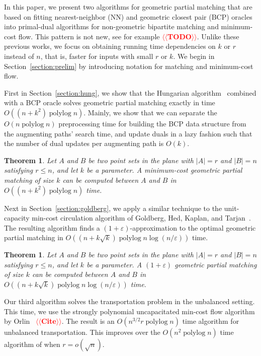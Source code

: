 \documentclass[11pt]{article}
\makeatletter
\def\polylog{\mathop{\mathrm{polylog}}}
\def\eps{\varepsilon}
\theoremstyle{plain}
\newtheorem{theorem}[lemma]{Theorem}
\numberwithin{figure}{section}
\def\n@te#1{\textsf{\boldmath \textbf{$\langle\!\langle$#1$\rangle\!\rangle$}}\leavevmode}
\def\note#1{\textcolor{red}{\n@te{#1}}}
\makeatother
\begin{document}
In this paper, we present two algorithms for geometric partial matching
that are based on fitting nearest-neighbor (NN) and geometric closest pair
(BCP) oracles into primal-dual algorithms for non-geometric bipartite matching
and minimum-cost flow.
This pattern is not new, see for example \note{TODO}.
Unlike these previous works, we focus on obtaining running time dependencies on
$k$ or $r$ instead of $n$, that is, faster for inputs with small $r$ or $k$.
We begin in Section~\ref{section:prelim} by introducing notation for matching
and minimum-cost flow.


First in Section~\ref{section:hung}, we show that the Hungarian algorithm~\cite{Kuhn55}
combined with a BCP oracle solves geometric partial matching exactly in time
$O((n + k^2)\polylog n)$.
Mainly, we show that we can separate the $O(n\polylog n)$ preprocessing time
for building the BCP data structure from the augmenting paths' search time,
and update duals in a lazy fashion such that the number of dual updates per
augmenting path is $O(k)$.

\begin{theorem}
\label{theorem:hung}
Let $A$ and $B$ be two point sets in the plane with $|A| = r$ and $|B| = n$ satisfying $r \le n$, and let $k$ be a
parameter.  A minimum-cost geometric partial matching of size $k$
can be computed between $A$ and $B$ in $O((n + k^2)\polylog n)$ time.
\end{theorem}


Next in Section~\ref{section:goldberg}, we apply a similar technique to the unit-capacity min-cost circulation
algorithm of Goldberg, Hed, Kaplan, and Tarjan~\cite{GHKT17}.
The resulting algorithm finds a $(1 + \eps)$-approximation to the optimal
geometric partial matching in $O((n + k\sqrt{k})\polylog n \log(n/\eps))$
time.

\begin{theorem}
\label{theorem:gmcm}
Let $A$ and $B$ be two point sets in the plane with $|A| = r$ and $|B| = n$ satisfying $r \le n$, and let $k$ be a
parameter.
A $(1+\eps)$ geometric partial matching of size $k$
can be computed between $A$ and $B$ in
$O((n + k\sqrt{k})\polylog n \log(n/\eps))$ time.
\end{theorem}


Our third algorithm solves the transportation problem in the unbalanced
setting.
This time, we use the strongly polynomial uncapacitated min-cost flow algorithm
by Orlin~\cite{xxx} \note{Cite}.
The result is an $O(n^{3/2} r \polylog n)$ time algorithm for unbalanced
transportation.
This improves over the $O(n^2 \polylog n)$ time algorithm of %
when $r = o(\sqrt{n})$.
\end{document}

